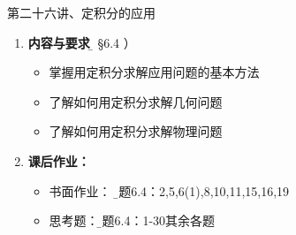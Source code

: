 \begin{frame}{第二十六讲、定积分的应用}
	\linespread{1.5}
	\begin{enumerate}
	  \item {\bf 内容与要求}{\b（ \S 6.4 ）}
	  \begin{itemize}
	    \item 掌握用定积分求解应用问题的基本方法
	    \item 了解如何用定积分求解几何问题
	    \item 了解如何用定积分求解物理问题
	  \vspace{1em}
	  \end{itemize}
	  \item {\bf 课后作业：}
	  \begin{itemize}
 	    \item 书面作业：
	     {\b 习题6.4：2,5,6(1),8,10,11,15,16,19}
  	    \item 思考题：{\b 习题6.4：1-30其余各题}
	  \end{itemize}
	\end{enumerate}
\end{frame}


